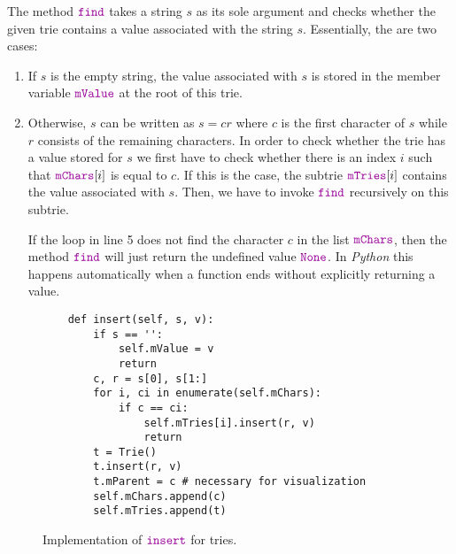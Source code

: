 The method $\mytt{find}$ takes a string $s$ as its sole argument and checks whether the given trie
contains a value associated with the string $s$.  Essentially, the are two cases:
\begin{enumerate}
\item If $s$ is the empty string, the value associated with $s$ is stored in the member variable
      $\mytt{mValue}$ at the root of this trie.
\item Otherwise, $s$ can be written as $s = cr$ where $c$ is the first character of $s$ while $r$
      consists of the remaining characters.  In order to check whether the trie has a value stored
      for $s$ we first have to check whether there is an index $i$ such that $\mytt{mChars}[i]$ is
      equal to $c$.  If this is the case, the subtrie $\mytt{mTries}[i]$ contains the value
      associated with $s$.  Then, we have to invoke $\mytt{find}$ recursively on this subtrie.

      If the loop in line 5 does not find the character $c$ in the list $\mytt{mChars}$, then the method
      $\mytt{find}$ will just return the undefined value $\mytt{None}$.  In \textsl{Python} this happens
      automatically when a function ends without explicitly returning a value.
\end{enumerate}


\begin{figure}[!ht]
\centering
\begin{verbatim}
    def insert(self, s, v):
        if s == '':
            self.mValue = v
            return
        c, r = s[0], s[1:]
        for i, ci in enumerate(self.mChars):
            if c == ci:
                self.mTries[i].insert(r, v)
                return
        t = Trie()
        t.insert(r, v)
        t.mParent = c # necessary for visualization
        self.mChars.append(c)
        self.mTries.append(t)
\end{verbatim}
\vspace*{-0.3cm}
\caption{Implementation of $\mytt{insert}$ for tries.}
\label{fig:trie.ipython-insert}
\end{figure}


